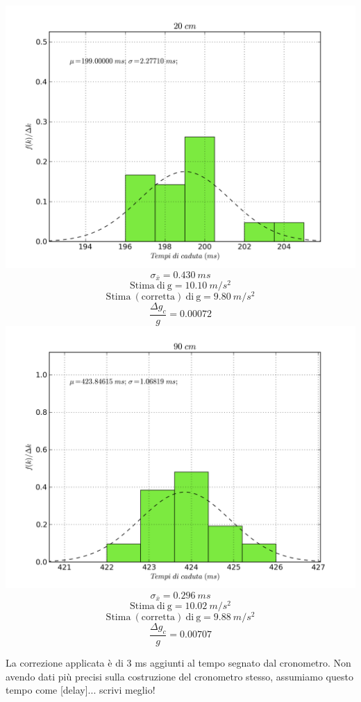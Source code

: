 \documentclass[a4paper,10pt]{report}
\begin{document}
\begin{center}
\includegraphics[scale=0.75]{../grafici/20cm.png}
$$\sigma_{\bar{x}} = 0.430\ ms$$
$$\mathrm{Stima\ di\ g} = 10.10\ m/s^2$$
$$\mathrm{Stima\ (corretta)\ di\ g} = 9.80\ m/s^2 $$
$$\frac{\Delta g_c}{g} = 0.00072$$
\includegraphics[scale=0.75]{../grafici/90cm.png}
$$\sigma_{\bar{x}} = 0.296\ ms $$
$$\mathrm{Stima\ di\ g} = 10.02\ m/s^2$$
$$\mathrm{Stima\ (corretta)\ di\ g} = 9.88\ m/s^2 $$
$$\frac{\Delta g_c}{g} = 0.00707$$
\end{center}

La correzione applicata è di 3 ms aggiunti al tempo segnato dal cronometro. Non avendo dati più precisi sulla costruzione del cronometro stesso, assumiamo questo tempo come [delay]... scrivi meglio!
\end{document}
